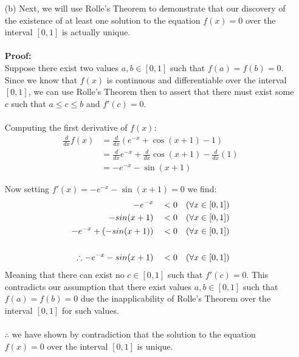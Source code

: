 \documentclass{article}
\begin{document}
\begin{enumerate}
    \item[(b)]  Next, we will use Rolle's Theorem to demonstrate that our discovery of the existence of at least one solution to the
                equation $f(x)=0$ over the interval $[0,1]$ is actually unique.\\
                \\
                \textbf{Proof:}\\
                Suppose there exist two values $a,b\in [0,1]$ such that $f(a)=f(b)=0$. Since we know that $f(x)$
                is continuous and differentiable over the interval $[0,1]$, we can use Rolle's Theorem then to assert that there must
                exist some $c$ such that $a\leq c \leq b$ and $f'(c)=0$.\\\\
                Computing the first derivative of $f(x)$:
                \begin{equation}
                    \begin{split}
                        \frac{d}{dx}f(x) &=\frac{d}{dx}\left(e^{-x}+\cos(x+1)-1\right)                  \\
                                         &=\frac{d}{dx}e^{-x}+\frac{d}{dx}\cos(x+1)-\frac{d}{dx}(1)     \\
                                         &=-e^{-x}-\sin(x+1)
                    \end{split}
                \end{equation}

                Now setting $f'(x)=-e^{-x}-\sin(x+1)=0$ we find:
                \begin{align}
                    \notag
                    -e^{-x}     \quad&<0\quad (\forall x \in [0,1])\\
                    \notag
                    -sin(x+1)   \quad&<0\quad (\forall x \in [0,1])\\
                    \notag
                    -e^{-x}+(-sin(x+1))   \quad&<0\quad (\forall x \in [0,1])\\
                    \notag\\
                    \therefore -e^{-x}-sin(x+1)   \quad&<0\quad (\forall x \in [0,1])
                \end{align}
                Meaning that there can exist no $c\in[0,1]$ such that $f'(c)=0$. This contradicts our assumption that there exist 
                values $a,b\in[0,1]$ such that $f(a)=f(b)=0$ due the inapplicability of Rolle's Theorem over the interval $[0,1]$
                for such values.\\\\
                $\therefore$ we have shown by contradiction that the solution to the equation $f(x)=0$ over the interval $[0,1]$ 
                is unique.
    \pagebreak\\\\
    

\end{enumerate}
\end{document}

